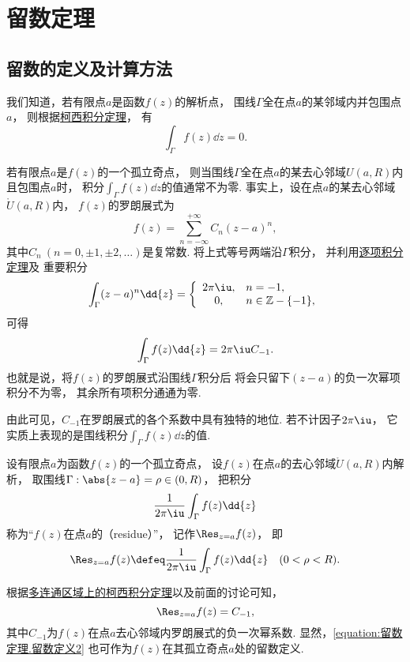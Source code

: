 \section{留数定理}
\subsection{留数的定义及计算方法}
我们知道，若有限点\(a\)是函数\(f(z)\)的解析点，
围线\(\Gamma\)全在点\(a\)的某邻域内并包围点\(a\)，
则根据\hyperref[theorem:解析函数的积分表示.柯西积分定理]{柯西积分定理}，
有\[
	\int_\Gamma f(z) \dd{z} = 0.
\]

若有限点\(a\)是\(f(z)\)的一个孤立奇点，
则当围线\(\Gamma\)全在点\(a\)的某去心邻域\(U(a,R)\)内且包围点\(a\)时，
积分\(\int_\Gamma f(z) \dd{z}\)的值通常不为零.
事实上，设在点\(a\)的某去心邻域\(\mathring{U}(a,R)\)内，
\(f(z)\)的罗朗展式为\[
	f(z) = \sum_{n=-\infty}^{+\infty} C_n (z-a)^n,
\]
其中\(C_n\ (n=0,\pm1,\pm2,\dotsc)\)是复常数.
将上式等号两端沿\(\Gamma\)积分，
并利用\hyperref[theorem:解析函数的级数表示.一致收敛级数的基本性质2]{逐项积分定理}及
重要积分  \[
	\int_\Gamma (z-a)^n \dd{z} = \left\{ \begin{array}{cl}
		2\pi\iu, & n=-1, \\
		0,& n\in\mathbb{Z}-\{-1\},
	\end{array} \right.
\]
可得\[
	\int_\Gamma f(z) \dd{z} = 2\pi\iu C_{-1}.
\]
也就是说，将\(f(z)\)的罗朗展式沿围线\(\Gamma\)积分后
将会只留下\((z-a)\)的负一次幂项积分不为零，
其余所有项积分通通为零.

由此可见，\(C_{-1}\)在罗朗展式的各个系数中具有独特的地位.
若不计因子\(2\pi\iu\)，
它实质上表现的是围线积分\(\int_\Gamma f(z) \dd{z}\)的值.

\begin{definition}
设有限点\(a\)为函数\(f(z)\)的一个孤立奇点，
设\(f(z)\)在点\(a\)的去心邻域\(\mathring{U}(a,R)\)内解析，
取围线\(\Gamma: \abs{z-a}=\rho\in(0,R)\)，
把积分\[
	\frac{1}{2\pi\iu} \int_\Gamma f(z) \dd{z}
\]
称为“\(f(z)\)在点\(a\)的（residue）”，
记作\(\Res_{z=a} f(z)\)，
即\begin{equation}\label{equation:留数定理.留数定义1}
	\Res_{z=a} f(z)
	\defeq
	\frac{1}{2\pi\iu} \int_\Gamma f(z) \dd{z}
	\quad(0<\rho<R).
\end{equation}
\end{definition}

根据\hyperref[theorem:解析函数的积分表示.多连通区域的柯西积分定理]{多连通区域上的柯西积分定理}以及前面的讨论可知，\begin{equation}\label{equation:留数定理.留数定义2}
	\Res_{z=a} f(z) = C_{-1},
\end{equation}
其中\(C_{-1}\)为\(f(z)\)在点\(a\)去心邻域内罗朗展式的负一次幂系数.
显然，\cref{equation:留数定理.留数定义2} 也可作为\(f(z)\)在其孤立奇点\(a\)处的留数定义.

